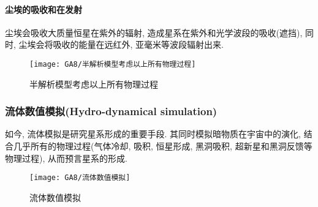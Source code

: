 \paragraph{尘埃的吸收和在发射}
尘埃会吸收大质量恒星在紫外的辐射, 造成星系在紫外和光学波段的吸收(遮挡), 同时, 尘埃会将吸收的能量在远红外, 亚毫米等波段辐射出来. 

\begin{figure}[!htb]
    \centering
    \texttt{[image: GA8/半解析模型考虑以上所有物理过程]}
    \caption{半解析模型考虑以上所有物理过程}
\end{figure}


\subsubsection{流体数值模拟(Hydro-dynamical simulation)}
如今, 流体模拟是研究星系形成的重要手段. 其同时模拟暗物质在宇宙中的演化, 结合几乎所有的物理过程(气体冷却, 吸积, 恒星形成, 黑洞吸积, 超新星和黑洞反馈等物理过程), 从而预言星系的形成. 

\begin{figure}[!htb]
    \centering
    \texttt{[image: GA8/流体数值模拟]}
    \caption{流体数值模拟}
\end{figure}


